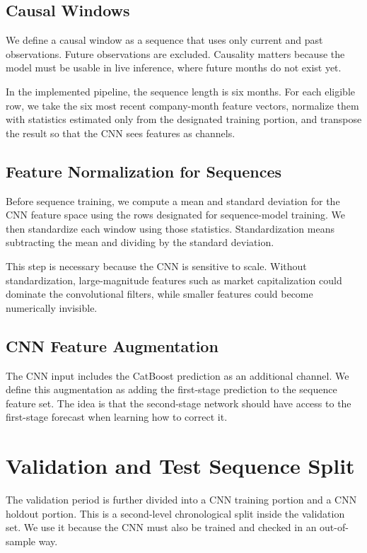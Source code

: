 \documentclass[11pt]{article}
\begin{document}
\subsection{Causal Windows}

We define a causal window as a sequence that uses only current and past observations. Future observations are excluded. Causality matters because the model must be usable in live inference, where future months do not exist yet.

In the implemented pipeline, the sequence length is six months. For each eligible row, we take the six most recent company-month feature vectors, normalize them with statistics estimated only from the designated training portion, and transpose the result so that the CNN sees features as channels.

\subsection{Feature Normalization for Sequences}

Before sequence training, we compute a mean and standard deviation for the CNN feature space using the rows designated for sequence-model training. We then standardize each window using those statistics. Standardization means subtracting the mean and dividing by the standard deviation.

This step is necessary because the CNN is sensitive to scale. Without standardization, large-magnitude features such as market capitalization could dominate the convolutional filters, while smaller features could become numerically invisible.

\subsection{CNN Feature Augmentation}

The CNN input includes the CatBoost prediction as an additional channel. We define this augmentation as adding the first-stage prediction to the sequence feature set. The idea is that the second-stage network should have access to the first-stage forecast when learning how to correct it.

\section{Validation and Test Sequence Split}

The validation period is further divided into a CNN training portion and a CNN holdout portion. This is a second-level chronological split inside the validation set. We use it because the CNN must also be trained and checked in an out-of-sample way.
\end{document}
